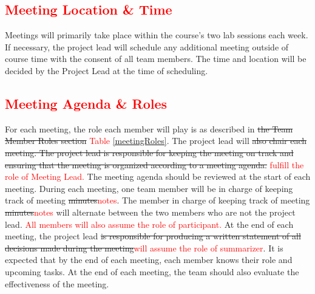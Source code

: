 \documentclass[12pt, titlepage]{article}
\begin{document}
\subsection{\textcolor{red}{Meeting Location \& Time}}
Meetings will primarily take place within the course's two lab sessions each week. If necessary, the project lead will schedule any additional meeting outside of course time with the consent of all team members. The time and location will be decided by the Project Lead at the time of scheduling. 

\subsection{\textcolor{red}{Meeting Agenda \& Roles}}
For each meeting, the role each member will play is as described in  \sout{the Team Member Roles section} \textcolor{red}{Table \ref{meetingRoles}}. The project lead will \sout{also chair each meeting. The project lead is responsible for keeping the meeting on track and ensuring that the meeting is organized according to a meeting agenda.} \textcolor{red}{fulfill the role of Meeting Lead.} The meeting agenda should be reviewed at the start of each meeting. During each meeting, one team member will be in charge of keeping track of meeting \sout{minutes}\textcolor{red}{notes}. The member in charge of keeping track of meeting \sout{minutes}\textcolor{red}{notes} will alternate between the two members who are not the project lead. \textcolor{red}{All members will also assume the role of participant.} At the end of each meeting, the project lead \sout{is responsible for producing a written statement of all decisions made during the meeting}\textcolor{red}{will assume the role of summarizer}. It is expected that by the end of each meeting, each member knows their role and upcoming tasks. At the end of each meeting, the team should also evaluate the effectiveness of the meeting.
\end{document}

